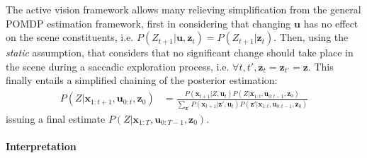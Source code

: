 \documentclass{article}
\begin{document}
The active vision framework allows many relieving simplification from the general POMDP estimation framework, first in considering that changing $\boldsymbol{u}$ has no effect on the scene constituents, i.e. $P(Z_{t+1}|\boldsymbol{u},\boldsymbol{z}_t) = P(Z_{t+1}|\boldsymbol{z}_t)$. Then, using the \emph{static} assumption, that considers that no significant change should take place in the scene during a saccadic exploration process, i.e. $\forall t, t', \boldsymbol{z}_{t} = \boldsymbol{z}_{t'} = \boldsymbol{z}$. This finally entails a simplified chaining of the posterior estimation:
\begin{align}
P(Z|\boldsymbol{x}_{1:t+1},\boldsymbol{u}_{0:t},\boldsymbol{z}_0) &= \frac{P(\boldsymbol{x}_{t+1}|Z,\boldsymbol{u}_t) P(Z|\boldsymbol{x}_{1:t}, \boldsymbol{u}_{0:t-1}, \boldsymbol{z}_0)}{\sum_{\boldsymbol{z}'}P(\boldsymbol{x}_{t+1}|\boldsymbol{z}',\boldsymbol{u}_t) P(\boldsymbol{z}'|\boldsymbol{x}_{1:t}, \boldsymbol{u}_{0:t-1}, \boldsymbol{z}_0)}
\end{align}
issuing a final estimate $P(Z|\boldsymbol{x}_{1:T}, \boldsymbol{u}_{0:T-1}, \boldsymbol{z}_0)$.  



\paragraph{Interpretation}
\end{document}
